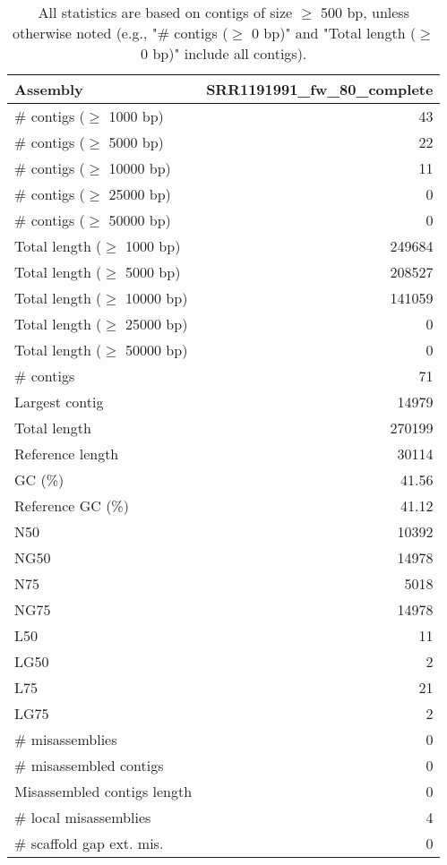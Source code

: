 \documentclass[12pt,a4paper]{article}
\begin{document}
\begin{table}[ht]
\begin{center}
\caption{All statistics are based on contigs of size $\geq$ 500 bp, unless otherwise noted (e.g., "\# contigs ($\geq$ 0 bp)" and "Total length ($\geq$ 0 bp)" include all contigs).}
\begin{tabular}{|l*{1}{|r}|}
\hline
Assembly & SRR1191991\_fw\_80\_complete \\ \hline
\# contigs ($\geq$ 1000 bp) & 43 \\ \hline
\# contigs ($\geq$ 5000 bp) & 22 \\ \hline
\# contigs ($\geq$ 10000 bp) & 11 \\ \hline
\# contigs ($\geq$ 25000 bp) & 0 \\ \hline
\# contigs ($\geq$ 50000 bp) & 0 \\ \hline
Total length ($\geq$ 1000 bp) & 249684 \\ \hline
Total length ($\geq$ 5000 bp) & 208527 \\ \hline
Total length ($\geq$ 10000 bp) & 141059 \\ \hline
Total length ($\geq$ 25000 bp) & 0 \\ \hline
Total length ($\geq$ 50000 bp) & 0 \\ \hline
\# contigs & 71 \\ \hline
Largest contig & 14979 \\ \hline
Total length & 270199 \\ \hline
Reference length & 30114 \\ \hline
GC (\%) & 41.56 \\ \hline
Reference GC (\%) & 41.12 \\ \hline
N50 & 10392 \\ \hline
NG50 & 14978 \\ \hline
N75 & 5018 \\ \hline
NG75 & 14978 \\ \hline
L50 & 11 \\ \hline
LG50 & 2 \\ \hline
L75 & 21 \\ \hline
LG75 & 2 \\ \hline
\# misassemblies & 0 \\ \hline
\# misassembled contigs & 0 \\ \hline
Misassembled contigs length & 0 \\ \hline
\# local misassemblies & 4 \\ \hline
\# scaffold gap ext. mis. & 0 \\ \hline

\end{tabular}
\end{center}
\end{table}
\end{document}

